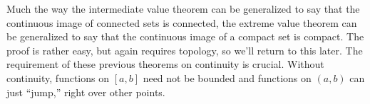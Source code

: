     Much the way the intermediate value theorem can be generalized to say that
    the continuous image of connected sets is connected, the extreme value
    theorem can be generalized to say that the continuous image of a compact
    set is compact. The proof is rather easy, but again requires topology, so
    we'll return to this later. The requirement of these previous theorems on
    continuity is crucial. Without continuity, functions on $[a,b]$ need not be
    bounded and functions on $(a,b)$ can just ``jump,'' right over other
    points.